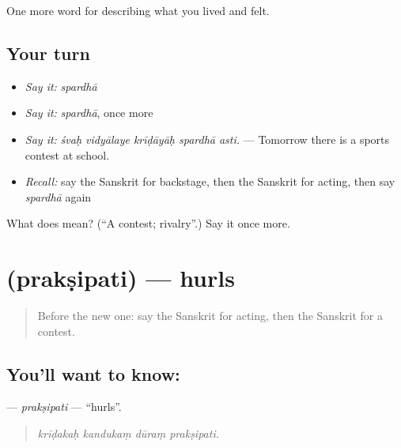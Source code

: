 \begin{grammarlens}[title={What you've built}]
One more word for describing what you lived and felt.
\end{grammarlens}

\subsection*{Your turn}
\begin{itemize}
\raggedright
  \item \emph{Say it:} \emph{spardhā}
  \item \emph{Say it:} \emph{spardhā}, once more
  \item \emph{Say it:} \emph{śvaḥ vidyālaye krīḍāyāḥ spardhā asti.} — Tomorrow there is a sports contest at school.
  \item \emph{Recall:} say the Sanskrit for backstage, then the Sanskrit for acting, then say \emph{spardhā} again
\end{itemize}

\begin{tcolorbox}[breakable,colback=teal!4,colframe=teal!35!black,title={Before you move on}]
What does  mean? (\textquotedblleft{}A contest; rivalry\textquotedblright{}.) Say it once more.
\end{tcolorbox}
\section[\texorpdfstring{\sk{प्रक्षिपति} (prakṣipati)}{प्रक्षिपति (prakṣipati)}]{ (prakṣipati) — hurls}

\label{lesson:SA-C524-praksipati}



\begin{quote}
Before the new one: say the Sanskrit for acting, then the Sanskrit for a contest.
\end{quote}

\subsection*{You'll want to know: }
\textbf{} — \emph{prakṣipati} — \textquotedblleft{}hurls\textquotedblright{}.

\begin{quote}
   
\end{quote}

\begin{quote}
\emph{krīḍakaḥ kandukaṃ dūraṃ prakṣipati.}
\end{quote}

